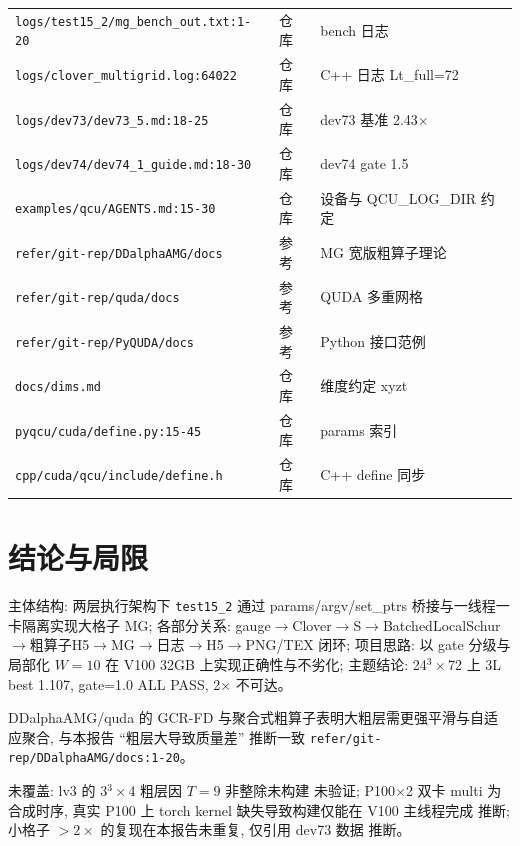 \documentclass[UTF8]{ctexart}
\begin{document}
\begin{xltabular}{\textwidth}{llX}
\texttt{\nolinkurl{logs/test15_2/mg_bench_out.txt:1-20}} & 仓库 & bench 日志 \\
\texttt{\nolinkurl{logs/clover_multigrid.log:64022}} & 仓库 & C++ 日志 Lt\_full=72 \\
\texttt{\nolinkurl{logs/dev73/dev73_5.md:18-25}} & 仓库 & dev73 基准 2.43$\times$ \\
\texttt{\nolinkurl{logs/dev74/dev74_1_guide.md:18-30}} & 仓库 & dev74 gate 1.5 \\
\texttt{\nolinkurl{examples/qcu/AGENTS.md:15-30}} & 仓库 & 设备与 QCU\_LOG\_DIR 约定 \\
\texttt{\nolinkurl{refer/git-rep/DDalphaAMG/docs}} & 参考 & MG 宽版粗算子理论 \\
\texttt{\nolinkurl{refer/git-rep/quda/docs}} & 参考 & QUDA 多重网格 \\
\texttt{\nolinkurl{refer/git-rep/PyQUDA/docs}} & 参考 & Python 接口范例 \\
\texttt{\nolinkurl{docs/dims.md}} & 仓库 & 维度约定 xyzt \\
\texttt{\nolinkurl{pyqcu/cuda/define.py:15-45}} & 仓库 & params 索引 \\
\texttt{\nolinkurl{cpp/cuda/qcu/include/define.h}} & 仓库 & C++ define 同步 \\
\bottomrule
\end{xltabular}

\section{结论与局限}
\begin{conclbox}
主体结构: 两层执行架构下 \texttt{\nolinkurl{test15_2}} 通过 params/argv/set\_ptrs 桥接与一线程一卡隔离实现大格子 MG; 各部分关系: gauge$\to$Clover$\to$S$\to$BatchedLocalSchur$\to$粗算子H5$\to$MG$\to$日志$\to$H5$\to$PNG/TEX 闭环; 项目思路: 以 gate 分级与局部化 $W=10$ 在 V100 32GB 上实现正确性与不劣化; 主题结论: 24$^3\times$72 上 3L best 1.107, gate=1.0 ALL PASS, 2$\times$ 不可达。
\end{conclbox}
\begin{refbox}
DDalphaAMG/quda 的 GCR-FD 与聚合式粗算子表明大粗层需更强平滑与自适应聚合, 与本报告 ``粗层大导致质量差'' 推断一致 \textcolor{evidence}{\texttt{\nolinkurl{refer/git-rep/DDalphaAMG/docs:1-20}}}。
\end{refbox}
\begin{warnbox}
未覆盖: lv3 的 3$^3\times$4 粗层因 $T=9$ 非整除未构建 \textcolor{warn}{未验证}; P100$\times$2 双卡 multi 为合成时序, 真实 P100 上 torch kernel 缺失导致构建仅能在 V100 主线程完成 \textcolor{warn}{推断}; 小格子 $>2\times$ 的复现在本报告未重复, 仅引用 dev73 数据 \textcolor{warn}{推断}。
\end{warnbox}
\end{document}
